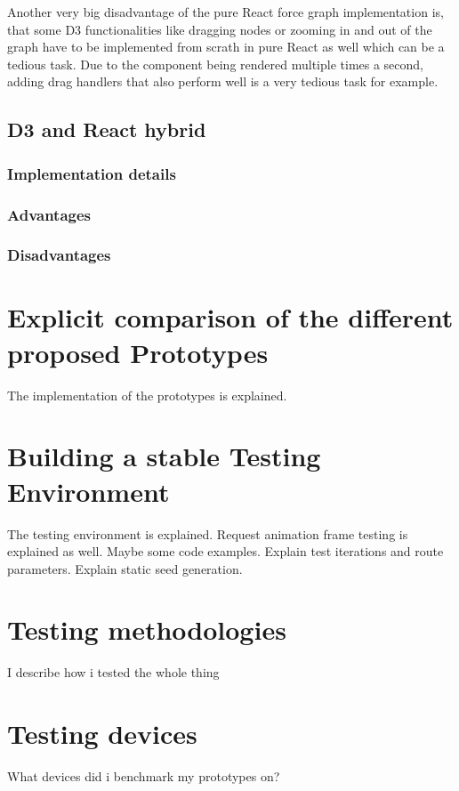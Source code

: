 Another very big disadvantage of the pure React force graph implementation is, that some D3 functionalities like dragging nodes or zooming in and out of the graph have to be implemented from scrath in pure React as well which can be a tedious task. Due to the component being rendered multiple times a second, adding drag handlers that also perform well is a very tedious task for example. 

\subsection{D3 and React hybrid}

\subsubsection{Implementation details}


\subsubsection{Advantages}

\subsubsection{Disadvantages}


\section{Explicit comparison of the different proposed Prototypes}

The implementation of the prototypes is explained.

\section{Building a stable Testing Environment}

The testing environment is explained. Request animation frame testing is explained as well. Maybe some code examples. Explain test iterations and route parameters. Explain static seed generation.

\section{Testing methodologies}

I describe how i tested the whole thing

\section{Testing devices}

What devices did i benchmark my prototypes on?

